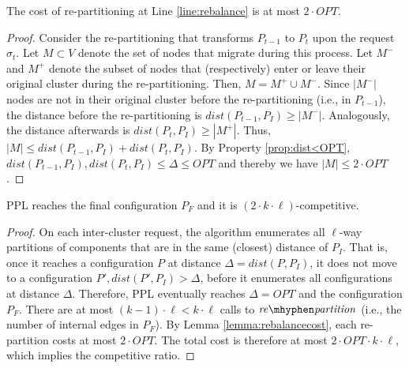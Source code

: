 \documentclass[manuscript,screen=true]{acmart}
\newcommand{\OPT}{\mathit{OPT}}
\newcommand\mahmoud[1]{\color{green}\textbf{\\ Mahmoud: #1}\\\color{black}}
\begin{document}
\begin{lemma}	\label{lemma:rebalancecost}
    The cost of re-partitioning at Line \ref{line:rebalance} is at most $2\cdot\OPT$.
\end{lemma}
\begin{proof}
    Consider the re-partitioning that transforms $P_{t-1}$ to $P_t$ upon the request $\sigma_t$.
    Let $M \subset V$ denote the set of nodes that migrate during this process.
	Let $M^-$ and $M^+$ denote the subset of nodes that (respectively)
    enter or leave their original cluster during the re-partitioning.    
    Then,
    $M = M^+ \cup M^-$.
    Since $|M^-|$ nodes are not in their original cluster before the re-partitioning (i.e., in $P_{t-1}$),
    the distance before the re-partitioning is $\mathit{dist}(P_{t-1},P_I) \geq | M^-|$.
    Analogously,
     the distance afterwards is $\mathit{dist}(P_{t},P_I) \geq | M^+|$.
    Thus,
    $|M| \leq \mathit{dist}(P_{t-1},P_I) + \mathit{dist}(P_{t},P_I)$.
    By Property \ref{prop:dist<OPT},
    $\mathit{dist}(P_{t-1},P_I) , \mathit{dist}(P_{t},P_I) \leq \Delta \leq \OPT$
    and thereby we have	
    $|M| \leq 2\cdot\OPT$.
\end{proof}

\begin{theorem}	\label{thm:upperbound}
    PPL reaches the final configuration $P_F$ and it is $(2\cdot k\cdot\ell)$-competitive.
\end{theorem}
\begin{proof}
      On each inter-cluster request,
     the algorithm enumerates all $\ell$-way partitions of components
     that are in the same (closest) distance of $P_I$.
     That is, 
     once it reaches a configuration $P$ at distance $\Delta = \mathit{dist} (P, P_I)$,
     it does not move to a configuration
     $P', \mathit{dist} (P', P_I) > \Delta$,
     before it enumerates all configurations at distance $\Delta$.
     Therefore,
     PPL eventually reaches $\Delta=\OPT$ and the configuration $P_F$.
    There are at most $(k-1)\cdot\ell < k\cdot\ell $ calls   to $\mathit{re\mhyphen partition}$
     (i.e., the number of internal edges in $P_F$).
    By Lemma \ref{lemma:rebalancecost},
    each re-partition costs at most $2\cdot\OPT$.
    The total cost is therefore at most $2\cdot\OPT\cdot k\cdot\ell$, which implies the competitive ratio.
 \end{proof}
\end{document}
